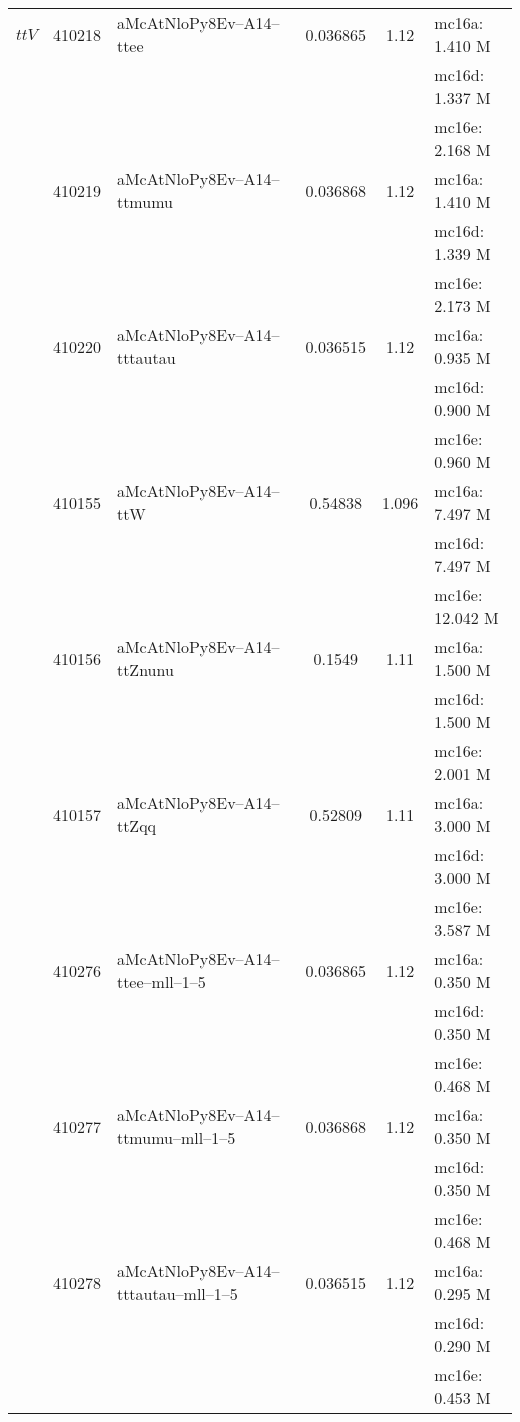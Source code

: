 \begin{center}
{\begin{xtabular}{lclS[round-mode=figures, round-precision=3]S[round-mode=places,  round-precision=2]l}
			\midrule
			$ttV$   & 410218 & aMcAtNloPy8Ev--A14--ttee                      &   0.036865   &  1.12   &  mc16a: 1.410 M \\
			& & & & & mc16d: 1.337 M \\
			& & & & & mc16e: 2.168 M \\
			& 410219 & aMcAtNloPy8Ev--A14--ttmumu                &   0.036868   &  1.12   &  mc16a: 1.410 M \\
			& & & & & mc16d: 1.339 M \\
			& & & & & mc16e: 2.173 M \\
			& 410220 & aMcAtNloPy8Ev--A14--tttautau                &   0.036515    & 1.12  &  mc16a: 0.935 M \\
			& & & & & mc16d: 0.900 M \\
			& & & & & mc16e: 0.960 M \\
			& 410155 & aMcAtNloPy8Ev--A14--ttW                       &   0.54838     & 1.096  & mc16a: 7.497 M  \\
			& & & & & mc16d: 7.497 M \\
			& & & & & mc16e: 12.042 M \\
			& 410156 & aMcAtNloPy8Ev--A14--ttZnunu                &   0.1549       & 1.11    & mc16a: 1.500 M  \\
			& & & & & mc16d: 1.500 M \\
			& & & & & mc16e: 2.001 M \\
			& 410157 & aMcAtNloPy8Ev--A14--ttZqq                    &   0.52809     & 1.11    &  mc16a: 3.000 M \\
			& & & & & mc16d: 3.000 M \\
			& & & & & mc16e: 3.587 M \\
			& 410276 & aMcAtNloPy8Ev--A14--ttee--mll--1--5 &   0.036865   &  1.12   &  mc16a: 0.350 M \\
			& & & & & mc16d: 0.350 M \\
			& & & & & mc16e: 0.468 M \\
			& 410277 & aMcAtNloPy8Ev--A14--ttmumu--mll--1--5  &   0.036868   &  1.12   &  mc16a: 0.350 M \\
			& & & & & mc16d: 0.350 M \\
			& & & & & mc16e: 0.468 M \\
			& 410278 & aMcAtNloPy8Ev--A14--tttautau--mll--1--5   &   0.036515    & 1.12  &  mc16a: 0.295 M \\
			& & & & & mc16d: 0.290 M \\
			& & & & & mc16e: 0.453 M \\
			

\end{xtabular}}
\end{center}
